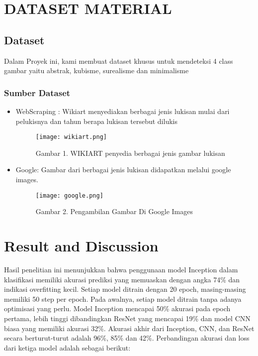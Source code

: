 \documentclass[12pt,a4paper]{article}
\begin{document}
\section{DATASET MATERIAL}
\subsection{Dataset}

Dalam Proyek ini, kami membuat dataset khusus untuk mendeteksi 4 class gambar yaitu abstrak, kubisme, surealisme dan minimalisme


\subsubsection{Sumber Dataset}
\begin{itemize}
    \item WebScraping : Wikiart menyediakan berbagai jenis lukisan mulai dari pelukisnya dan tahun berapa lukisan tersebut dilukis
    \begin{figure}[H]
        \centering
       \texttt{[image: wikiart.png]}
        \caption*{Gambar 1. WIKIART penyedia berbagai jenis gambar lukisan}
        \label{fig:enter-label}
    \end{figure}
    \item Google: Gambar dari berbagai jenis lukisan didapatkan melalui google images.
    \begin{figure}[H]
        \centering
        \texttt{[image: google.png]}
        \caption*{Gambar 2. Pengambilan Gambar Di Google Images}
        \label{fig:enter-label}
    \end{figure}
    \begin{figure}[H]
        \centering
        \label{fig:enter-label}
    \end{figure}
\end{itemize}


\section{Result and Discussion}
Hasil penelitian ini menunjukkan bahwa penggunaan model Inception dalam klasifikasi  memiliki akurasi prediksi yang memuaskan dengan angka 74\% dan indikasi overfitting kecil. Setiap model ditrain dengan 20 epoch, masing-masing memiliki 50 step per epoch. Pada awalnya, setiap model ditrain tanpa adanya optimisasi yang perlu. Model Inception mencapai 50\% akurasi pada epoch pertama, lebih tinggi dibandingkan ResNet yang mencapai 19\% dan model CNN biasa yang memiliki akurasi 32\%. Akurasi akhir dari Inception, CNN, dan ResNet secara berturut-turut adalah 96\%, 85\% dan 42\%. Perbandingan akurasi dan loss dari ketiga model adalah sebagai berikut:
\end{document}
